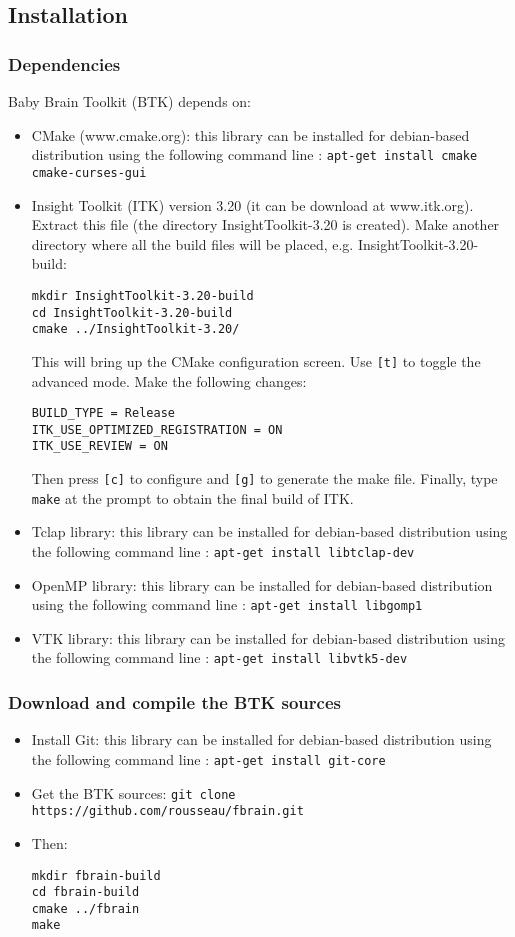 \documentclass[a4paper,10pt]{article}
\begin{document}
\subsection{Installation}

\subsubsection{Dependencies}

Baby Brain Toolkit (BTK) depends on:
\begin{itemize}
 \item CMake (www.cmake.org): this library can be installed for debian-based
distribution using the following command line : \texttt{apt-get install
cmake cmake-curses-gui}
 \item Insight Toolkit (ITK) version 3.20 (it can be download at www.itk.org). Extract this file (the directory InsightToolkit-3.20 is created). Make another directory where all the build files will be placed, e.g. InsightToolkit-3.20-build:
\begin{verbatim}
mkdir InsightToolkit-3.20-build
cd InsightToolkit-3.20-build
cmake ../InsightToolkit-3.20/
\end{verbatim}
This will bring up the CMake configuration screen. Use \texttt{[t]} to toggle the advanced mode. Make the following changes:
\begin{verbatim}
BUILD_TYPE = Release
ITK_USE_OPTIMIZED_REGISTRATION = ON
ITK_USE_REVIEW = ON
\end{verbatim}
Then press \texttt{[c]} to configure and \texttt{[g]} to generate the make file. Finally, type \texttt{make} at the prompt to obtain the final build of ITK.
 \item Tclap library: this library can be installed for debian-based
distribution using the following command line : \texttt{apt-get install
libtclap-dev}
 \item OpenMP library: this library can be installed for debian-based
distribution using the following command line : \texttt{apt-get install
libgomp1}
 \item VTK library: this library can be installed for debian-based
distribution using the following command line : \texttt{apt-get install
libvtk5-dev}
\end{itemize}

\subsubsection{Download and compile the BTK sources}
\begin{itemize}
 \item Install Git: this library can be installed for debian-based distribution using the following command line : \texttt{apt-get install git-core}
 \item Get the BTK sources: \texttt{git clone https://github.com/rousseau/fbrain.git }
 \item Then:
\begin{verbatim}
mkdir fbrain-build
cd fbrain-build
cmake ../fbrain
make
\end{verbatim}
\end{itemize}
\end{document}
